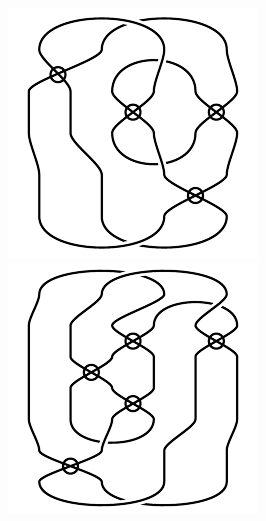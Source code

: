 \begin{figure}[H]
\begin{minipage}[b]{.18\linewidth}
\centering
\includegraphics[width=\linewidth]{../data/virtual_4_97.png}
\end{minipage}
\begin{minipage}[b]{.18\linewidth}
\centering
\includegraphics[width=\linewidth]{../data/virtual_4_98.png}

\end{minipage}
\end{figure}
